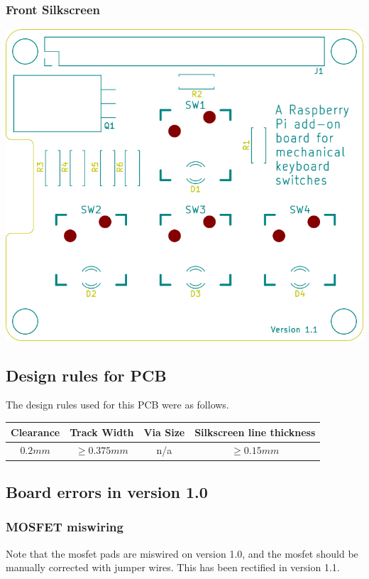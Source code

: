 \documentclass[10pt, a4paper, onesided]{article}
\begin{document}
		\subsubsection*{Front Silkscreen}
		\begin{center}
			\includegraphics[width=0.7\linewidth]{img/F_Ss}
		\end{center}
	
	\subsection*{Design rules for PCB}

		The design rules used for this PCB were as follows.
	
		\begin{tabular}{c|c|c|c}
			Clearance & Track Width & Via Size & Silkscreen line thickness \\ 
			\hline 
			$0.2 mm$ & $\ge 0.375 mm$ & n/a & $\ge 0.15 mm$ \\ 
		\end{tabular}

\iffalse
	\subsection{Board errors in version 1.0}
	
		\subsubsection*{MOSFET miswiring}
		\label{MOSFETerror}
		
		Note that the mosfet pads are miswired on version 1.0, and the mosfet should be manually corrected with jumper wires. This has been rectified in version 1.1.
	
\end{document}
